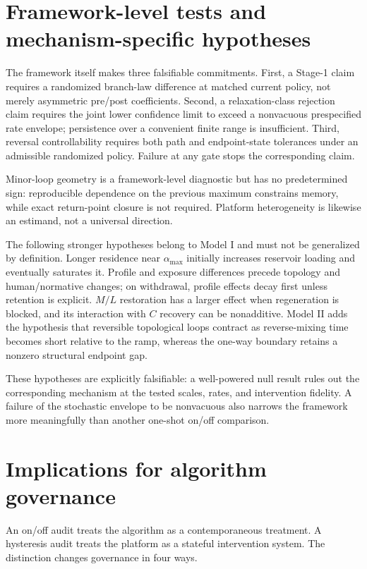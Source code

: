 \documentclass[10pt,a4paper]{article}
\newcommand{\alphamax}{\alpha_{\max}}
\begin{document}
\section{Framework-level tests and mechanism-specific hypotheses}

The framework itself makes three falsifiable commitments. First, a Stage-1 claim requires a randomized branch-law difference at matched current policy, not merely asymmetric pre/post coefficients. Second, a relaxation-class rejection claim requires the joint lower confidence limit to exceed a nonvacuous prespecified rate envelope; persistence over a convenient finite range is insufficient. Third, reversal controllability requires both path and endpoint-state tolerances under an admissible randomized policy. Failure at any gate stops the corresponding claim.

Minor-loop geometry is a framework-level diagnostic but has no predetermined sign: reproducible dependence on the previous maximum constrains memory, while exact return-point closure is not required. Platform heterogeneity is likewise an estimand, not a universal direction.

The following stronger hypotheses belong to Model I and must not be generalized by definition. Longer residence near $\alphamax$ initially increases reservoir loading and eventually saturates it. Profile and exposure differences precede topology and human/normative changes; on withdrawal, profile effects decay first unless retention is explicit. $M/L$ restoration has a larger effect when regeneration is blocked, and its interaction with $C$ recovery can be nonadditive. Model II adds the hypothesis that reversible topological loops contract as reverse-mixing time becomes short relative to the ramp, whereas the one-way boundary retains a nonzero structural endpoint gap.

These hypotheses are explicitly falsifiable: a well-powered null result rules out the corresponding mechanism at the tested scales, rates, and intervention fidelity. A failure of the stochastic envelope to be nonvacuous also narrows the framework more meaningfully than another one-shot on/off comparison.

\section{Implications for algorithm governance}

An on/off audit treats the algorithm as a contemporaneous treatment. A hysteresis audit treats the platform as a stateful intervention system. The distinction changes governance in four ways.
\end{document}
